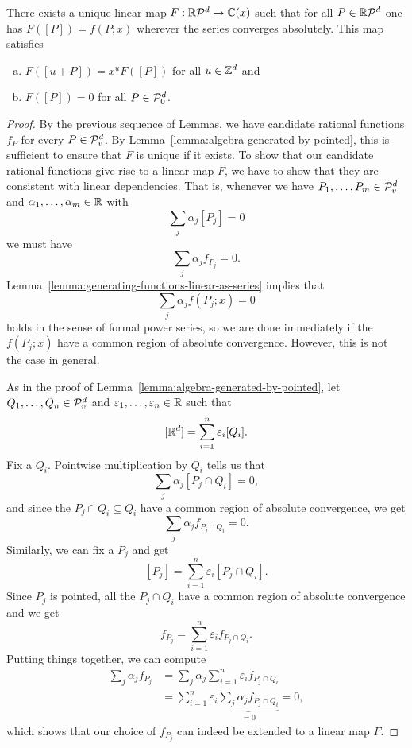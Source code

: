 \begin{theorem}
  \label{thm:rational-generating-functions}
  There exists a unique linear map $F: \mathbb{R}\mathcal{P}^d \to \mathbb{C}(x)$
  such that for all $P \in \mathbb{R}\mathcal{P}^d$ one has $F([P]) = f(P;x)$ wherever the series converges absolutely.
  This map satisfies
  \begin{enumerate}[(a)]
    \item $F([u + P]) = x^u F([P])$ for all $u \in \mathbb{Z}^d$ and
    \item $F([P]) = 0$ for all $P \in \mathcal{P}_0^d$.
  \end{enumerate}
\end{theorem}
\begin{proof}
  By the previous sequence of Lemmas, we have candidate rational functions $f_P$
  for every $P \in \mathcal{P}_v^d$.
  By Lemma~\ref{lemma:algebra-generated-by-pointed},
  this is sufficient to ensure that $F$ is unique if it exists.
  To show that our candidate rational functions give rise to a linear map $F$,
  we have to show that they are consistent with linear dependencies.
  That is, whenever we have $P_1,\ldots,P_m \in \mathcal{P}_v^d$ and $\alpha_1,\ldots,\alpha_m \in \mathbb{R}$ with
  \[
    \sum_j \alpha_j [P_j] = 0
  \]
  we must have
  \[
    \sum_j \alpha_j f_{P_j} = 0.
  \]
  Lemma~\ref{lemma:generating-functions-linear-as-series} implies that
  \[
    \sum_j \alpha_j f(P_j;x) = 0
  \]
  holds in the sense of formal power series,
  so we are done immediately if the $f(P_j;x)$ have a common region of absolute convergence.
  However, this is not the case in general.

  As in the proof of Lemma~\ref{lemma:algebra-generated-by-pointed},
  let $Q_1, \ldots, Q_n \in \mathcal{P}_v^d$ and $\varepsilon_1, \ldots, \varepsilon_n \in \mathbb{R}$ such that
  \[
    [\mathbb{R}^d] = \sum_{i=1}^n \varepsilon_i [Q_i].
  \]
  Fix a $Q_i$. Pointwise multiplication by $Q_i$ tells us that
  \[
    \sum_j \alpha_j [P_j \cap Q_i] = 0,
  \]
  and since the $P_j \cap Q_i \subseteq Q_i$ have a common region of absolute convergence,
  we get
  \[
    \sum_j \alpha_j f_{P_j \cap Q_i} = 0.
  \]
  Similarly, we can fix a $P_j$ and get
  \[
    [P_j] = \sum_{i=1}^n \varepsilon_i [P_j \cap Q_i].
  \]
  Since $P_j$ is pointed, all the $P_j \cap Q_i$ have a common region of absolute convergence
  and we get
  \[
    f_{P_j} = \sum_{i=1}^n \varepsilon_i f_{P_j \cap Q_i}.
  \]
  Putting things together, we can compute
  \begin{align*}
    \sum_j \alpha_j f_{P_j}
     &= \sum_j \alpha_j \sum_{i=1}^n \varepsilon_i f_{P_j \cap Q_i} \\
     &= \sum_{i=1}^n \varepsilon_i \underbrace{\sum_j \alpha_j f_{P_j \cap Q_i}}_{=0} = 0,
  \end{align*}
  which shows that our choice of $f_{P_j}$ can indeed be extended to a linear map $F$.


\end{proof}
